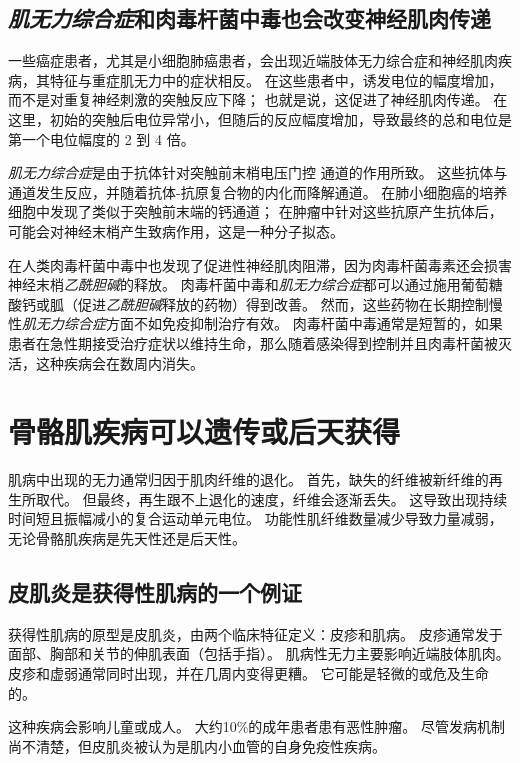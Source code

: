 \subsection{\textit{肌无力综合症}和肉毒杆菌中毒也会改变神经肌肉传递}

一些癌症患者，尤其是小细胞肺癌患者，会出现近端肢体无力综合症和神经肌肉疾病，其特征与重症肌无力中的症状相反。
在这些患者中，诱发电位的幅度增加，而不是对重复神经刺激的突触反应下降；
也就是说，这促进了神经肌肉传递。
在这里，初始的突触后电位异常小，但随后的反应幅度增加，导致最终的总和电位是第一个电位幅度的 2 到 4 倍。


\textit{肌无力综合症}是由于抗体针对突触前末梢电压门控  通道的作用所致。
这些抗体与通道发生反应，并随着抗体-抗原复合物的内化而降解通道。
在肺小细胞癌的培养细胞中发现了类似于突触前末端的钙通道；
在肿瘤中针对这些抗原产生抗体后，可能会对神经末梢产生致病作用，这是一种分子拟态。


在人类肉毒杆菌中毒中也发现了促进性神经肌肉阻滞，因为肉毒杆菌毒素还会损害神经末梢\textit{乙酰胆碱}的释放。
肉毒杆菌中毒和\textit{肌无力综合症}都可以通过施用葡萄糖酸钙或胍（促进\textit{乙酰胆碱}释放的药物）得到改善。
然而，这些药物在长期控制慢性\textit{肌无力综合症}方面不如免疫抑制治疗有效。
肉毒杆菌中毒通常是短暂的，如果患者在急性期接受治疗症状以维持生命，那么随着感染得到控制并且肉毒杆菌被灭活，这种疾病会在数周内消失。



\section{骨骼肌疾病可以遗传或后天获得}

肌病中出现的无力通常归因于肌肉纤维的退化。
首先，缺失的纤维被新纤维的再生所取代。
但最终，再生跟不上退化的速度，纤维会逐渐丢失。
这导致出现持续时间短且振幅减小的复合运动单元电位。
功能性肌纤维数量减少导致力量减弱，无论骨骼肌疾病是先天性还是后天性。



\subsection{皮肌炎是获得性肌病的一个例证}

获得性肌病的原型是皮肌炎，由两个临床特征定义：皮疹和肌病。
皮疹通常发于面部、胸部和关节的伸肌表面（包括手指）。
肌病性无力主要影响近端肢体肌肉。
皮疹和虚弱通常同时出现，并在几周内变得更糟。
它可能是轻微的或危及生命的。


这种疾病会影响儿童或成人。
大约10\%的成年患者患有恶性肿瘤。
尽管发病机制尚不清楚，但皮肌炎被认为是肌内小血管的自身免疫性疾病。




